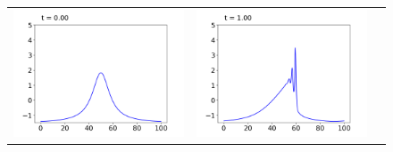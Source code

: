 \documentclass[11pt]{ltjsarticle}
\numberwithin{equation}{section}
\begin{document}
\begin{figure}[H]
    \centering
    \begin{tabular}{ccc}
    \begin{minipage}[b]{0.33\hsize}
        \includegraphics[width=\hsize]{../images/kdv_0.png}
    \end{minipage}
    &
    \begin{minipage}[b]{0.33\hsize}
        \includegraphics[width=\hsize]{../images/kdv_1.png}
    \end{minipage}
    &
    \begin{minipage}[b]{0.33\hsize}

\end{minipage}
\end{tabular}
\end{figure}
\end{document}
